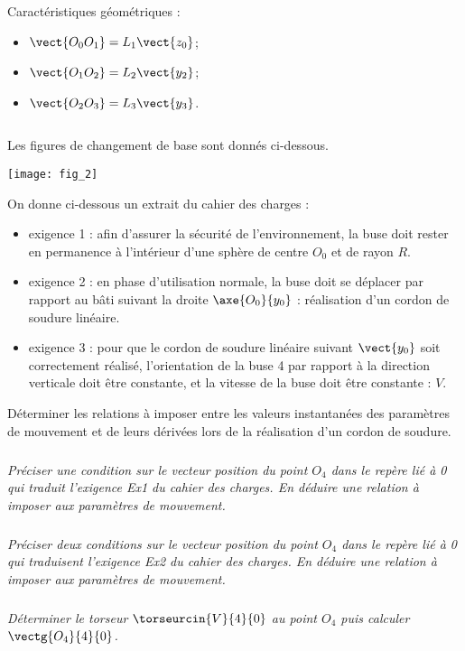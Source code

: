 \begin{multicols}{2}
\begin{multicols}{2}
 \noindent  Caractéristiques géométriques :
\begin{itemize}
\item $\vect{O_0O_1} = L_1\vect{z_0}$;
\item $\vect{O_1O_2} = L_2\vect{y_2}$;
\item $\vect{O_2O_3} = L_3\vect{y_3}$.
\end{itemize}
$\quad$


\end{multicols}


Les figures de changement de base sont donnés ci-dessous.
\begin{center}
\texttt{[image: fig\_2]}
\end{center}

\noindent On donne ci-dessous un extrait du cahier des charges :
\begin{itemize}
\item exigence 1 : afin d’assurer la sécurité de l’environnement, la buse doit rester en permanence à l’intérieur
d’une sphère de centre $O_0$ et de rayon $R$.
\item exigence 2 : en phase d’utilisation normale, la buse doit se déplacer par rapport au bâti suivant la droite $\axe{O_0}{y_0}$ : réalisation d’un cordon de soudure linéaire.
\item exigence 3 : pour que le cordon de soudure linéaire suivant $\vect{y_0}$ soit correctement réalisé, l’orientation de la
buse 4 par rapport à la direction verticale doit être constante, et la vitesse de la buse doit être 
constante : $V$.
\end{itemize}

\begin{obj}
Déterminer les relations à imposer entre les valeurs instantanées des paramètres de mouvement et
de leurs dérivées lors de la réalisation d’un cordon de soudure.
\end{obj}

\subparagraph{}
\textit{Préciser une condition sur le vecteur position du point $O_4$ dans le repère lié à 0 qui traduit l’exigence Ex1 du
cahier des charges. En déduire une relation à imposer aux paramètres de mouvement.}


\subparagraph{}
\textit{Préciser deux conditions sur le vecteur position du point $O_4$ dans le repère lié à 0 qui traduisent l’exigence Ex2 du
cahier des charges. En déduire une relation à imposer aux paramètres de mouvement.}


\subparagraph{}
\textit{Déterminer le torseur $\torseurcin{V}{4}{0}$ au point $O_4$ puis calculer $\vectg{O_4}{4}{0}$.}





\end{multicols}
